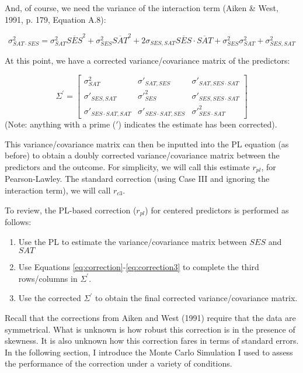 \documentclass[english,man]{apa6}
\theoremstyle{definition}
\theoremstyle{definition}
\theoremstyle{remark}
\begin{document}
And, of course, we need the variance of the interaction term (Aiken \&
West, 1991, p. 179, Equation A.8):

\begin{equation}
\sigma^2_{SAT\cdot SES} = \sigma^2_{SAT}\overline{SES}^2 + \sigma^2_{SES}\overline{SAT}^2 + 2\sigma_{SES,SAT}\overline{SES}\cdot \overline{SAT} + \sigma^2_{SES}\sigma^2_{SAT} + \sigma^2_{SES,SAT}
\label{eq:correction3}
\end{equation}

At this point, we have a corrected variance/covariance matrix of the
predictors:

\[
   \Sigma^\prime=
  \left[ {\begin{array}{ccc}
   \sigma^2_{SAT} & \sigma\prime_{SAT,{SES}} & \sigma\prime_{SAT,SES\cdot SAT} \\
    \sigma\prime_{SES,SAT} & \sigma\prime^2_{SES} & \sigma\prime_{SES,SES\cdot SAT} \\
    \sigma\prime_{SES\cdot SAT,SAT} &\sigma\prime_{SES\cdot SAT,SES} & \sigma\prime^2_{SES\cdot SAT}
  \end{array} } \right]
\] \label{eq:matrix} \noindent (Note: anything with a prime (\(\prime\))
indicates the estimate has been corrected).

This variance/covariance matrix can then be inputted into the PL
equation (as before) to obtain a doubly corrected variance/covariance
matrix between the predictors and the outcome. For simplicity, we will
call this estimate \(r_{pl}\), for Pearson-Lawley. The standard
correction (using Case III and ignoring the interaction term), we will
call \(r_{c3}\).

To review, the PL-based correction (\(r_{pl}\)) for centered predictors
is performed as follows:

\begin{enumerate}
\item Use the PL to estimate the variance/covariance matrix between $SES$ and $SAT$
\item Use Equations \ref{eq:correction}-\ref{eq:correction3} to complete the third rows/columns in $\Sigma^\prime$.
\item Use the corrected $\Sigma^\prime$ to obtain the final corrected variance/covariance matrix. 
\end{enumerate}

Recall that the corrections from Aiken and West (1991) require that the
data are symmetrical. What is unknown is how robust this correction is
in the presence of skewness. It is also unknown how this correction
fares in terms of standard errors. In the following section, I introduce
the Monte Carlo Simulation I used to assess the performance of the
correction under a variety of conditions.
\end{document}
